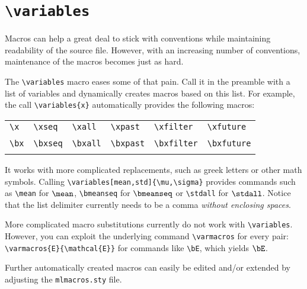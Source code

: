 \section{\texttt{\textbackslash variables}}
Macros can help a great deal to stick with conventions while maintaining readability of the source file. 
However, with an increasing number of conventions, maintenance of the macros becomes just as hard.

The \verb|\variables| macro eases some of that pain. 
Call it in the preamble with a list of variables and dynamically creates macros based on this list. 
For example, the call \verb|\variables{x}| automatically provides the following macros:

\begin{table}[h!]
	\centering
	\begin{tabular}{llllll}

		\verb|\x| & \verb|\xseq| & \verb|\xall| & \verb|\xpast| & \verb|\xfilter| & \verb|\xfuture|\\
		\x & \xseq & \xall & \xpast & \xfilter & \xfuture\\[1.5em]		

		\verb|\bx| & \verb|\bxseq| & \verb|\bxall| & \verb|\bxpast| & \verb|\bxfilter| & \verb|\bxfuture|\\
		\bx & \bxseq & \bxall & \bxpast & \bxfilter & \bxfuture
	\end{tabular}
\end{table}

It works with more complicated replacements, such as greek letters or other math symbols. 
Calling \verb|\variables[mean,std]{\mu,\sigma}| provides commands such as \verb|\mean| for $\mean$, \verb|\bmeanseq| for $\bmeanseq$ or \verb|\stdall| for $\stdall$.
Notice that the list delimiter currently needs to be a comma \emph{without enclosing spaces}.

More complicated macro substitutions currently do not work with \verb|\variables|. However, you can exploit the underlying command \verb|\varmacros| for every pair: \verb|\varmacros{E}{\mathcal{E}}| for commands like \verb|\bE|, which yields $\bE$.

Further automatically created macros can easily be edited and/or extended by adjusting the \verb|mlmacros.sty| file.